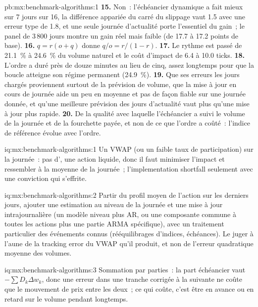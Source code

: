 \begin{solution}{pb:mx:benchmark-algorithms:1}
\textbf{15.} Non~: l'échéancier dynamique a fait mieux sur 7 jours sur 16, la différence appariée du carré du slippage vaut 1.5 avec une erreur type de 1.8, et
une seule journée d'actualité porte l'essentiel du gain~; le panel de 3\,800 jours montre un gain réel mais faible (de 17.7 à 17.2 points de base).
\textbf{16.} $q=r(o+q)$ donne $q/o=r/(1-r)$.
\textbf{17.} Le rythme est passé de 21.1~\% à 24.6~\% du volume naturel et le coût d'impact de 6.4 à 10.0 ticks.
\textbf{18.} L'ordre a duré près de douze minutes au lieu de cinq, assez longtemps pour que la boucle atteigne son régime permanent (24.9~\%).
\textbf{19.} Que ses erreurs les jours chargés proviennent surtout de la prévision de volume, que la mise à jour en cours de journée aide un peu en moyenne et pas de façon fiable
sur une journée donnée, et qu'une meilleure prévision des jours d'actualité vaut plus qu'une mise à jour plus rapide.
\textbf{20.} De la qualité avec laquelle l'échéancier a suivi le volume de la journée et de la fourchette payée, et non de ce que l'ordre a coûté~: l'indice
de référence évolue avec l'ordre.
\end{solution}

\begin{solution}{iq:mx:benchmark-algorithms:1}
Un VWAP (ou un faible taux de participation) sur la journée~: pas d', une action liquide, donc il faut minimiser l'impact et ressembler à la moyenne de la journée~; l'implementation
shortfall seulement avec une conviction qui s'effrite.
\end{solution}

\begin{solution}{iq:mx:benchmark-algorithms:2}
Partir du profil moyen de l'action sur les derniers jours, ajouter une estimation au niveau de la journée et une mise à jour intrajournalière (un modèle niveau plus AR, ou une composante commune
à toutes les actions plus une partie ARMA spécifique), avec un traitement particulier des événements connus (rééquilibrages d'indices, échéances). Le juger à l'aune de la
tracking error du VWAP qu'il produit, et non de l'erreur quadratique moyenne des volumes.
\end{solution}

\begin{solution}{iq:mx:benchmark-algorithms:3}
Sommation par parties~: la part échéancier vaut $-\sum D_k\Delta w_k$, donc une erreur dans une tranche corrigée à la suivante ne coûte que le mouvement de prix
entre les deux~; ce qui coûte, c'est être en avance ou en retard sur le volume pendant longtemps.
\end{solution}

